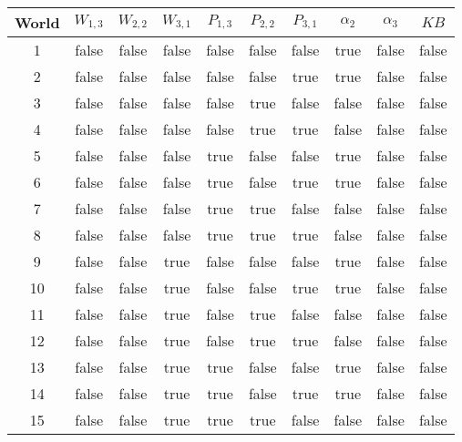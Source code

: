 \begin{enumerate}
\newcommand{\F}{{\color{WildStrawberry}false}}
\newcommand{\T}{{\color{YellowGreen}true}}

\begin{tabular}{c|cccccc|cc|c}

World & $W_{1,3}$ & $W_{2,2}$ & $W_{3,1}$ & $P_{1,3}$ & $P_{2,2}$ & $P_{3,1}$ & $\alpha_2$ & $\alpha_3$ & $KB$ \\ 
\hline
1	  & \F        & \F        & \F        & \F        & \F        & \F        & \T         & \F         & \F   \\
2	  & \F        & \F        & \F        & \F        & \F        & \T        & \T         & \F         & \F   \\
3	  & \F        & \F        & \F        & \F        & \T        & \F        & \F         & \F         & \F   \\
4	  & \F        & \F        & \F        & \F        & \T        & \T        & \F         & \F         & \F   \\
5	  & \F        & \F        & \F        & \T        & \F        & \F        & \T         & \F         & \F   \\
6	  & \F        & \F        & \F        & \T        & \F        & \T        & \T         & \F         & \F   \\
7	  & \F        & \F        & \F        & \T        & \T        & \F        & \F         & \F         & \F   \\
8	  & \F        & \F        & \F        & \T        & \T        & \T        & \F         & \F         & \F   \\
9	  & \F        & \F        & \T        & \F        & \F        & \F        & \T         & \F         & \F   \\
10	  & \F        & \F        & \T        & \F        & \F        & \T        & \T         & \F         & \F   \\
11	  & \F        & \F        & \T        & \F        & \T        & \F        & \F         & \F         & \F   \\
12	  & \F        & \F        & \T        & \F        & \T        & \T        & \F         & \F         & \F   \\
13	  & \F        & \F        & \T        & \T        & \F        & \F        & \T         & \F         & \F   \\
14	  & \F        & \F        & \T        & \T        & \F        & \T        & \T         & \F         & \F   \\
15	  & \F        & \F        & \T        & \T        & \T        & \F        & \F         & \F         & \F   \\

\end{tabular}
\end{enumerate}
